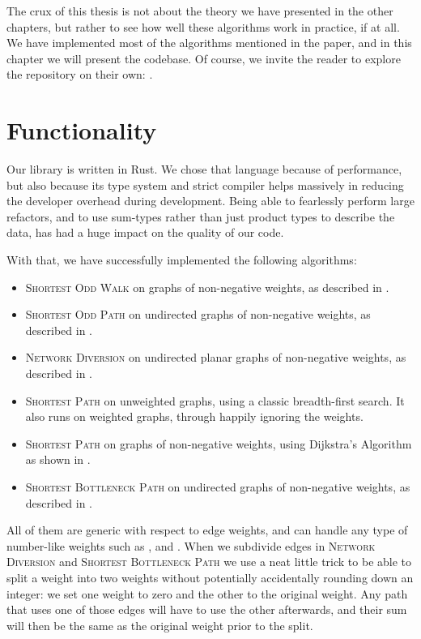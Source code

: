 The crux of this thesis is not about the theory we have presented in the other chapters, but rather to see how well these algorithms work in practice, if at all. We have implemented most of the algorithms mentioned in the paper, and in this chapter we will present the codebase. Of course, we invite the reader to explore the repository on their own: \cite{source:codebase}.

\section{Functionality}
Our library is written in Rust. We chose that language because of performance, but also because its type system and strict compiler helps massively in reducing the developer overhead during development. Being able to fearlessly perform large refactors, and to use sum-types rather than just product types to describe the data, has had a huge impact on the quality of our code.

With that, we have successfully implemented the following algorithms:

\begin{itemize}
    \item \textsc{Shortest Odd Walk} on graphs of non-negative weights, as described in .
    \item \textsc{Shortest Odd Path} on undirected graphs of non-negative weights, as described in .
    \item \textsc{Network Diversion} on undirected planar graphs of non-negative weights, as described in .
    \item \textsc{Shortest Path} on unweighted graphs, using a classic breadth-first search. It also runs on weighted graphs, through happily ignoring the weights.
    \item \textsc{Shortest Path} on graphs of non-negative weights, using Dijkstra's Algorithm as shown in .
    \item \textsc{Shortest Bottleneck Path} on undirected graphs of non-negative weights, as described in .
\end{itemize}

All of them are generic with respect to edge weights, and can handle any type of number-like weights such as ,  and . When we subdivide edges in \textsc{Network Diversion} and \textsc{Shortest Bottleneck Path} we use a neat little trick to be able to split a weight into two weights without potentially accidentally rounding down an integer: we set one weight to zero and the other to the original weight. Any path that uses one of those edges will have to use the other afterwards, and their sum will then be the same as the original weight prior to the split.

